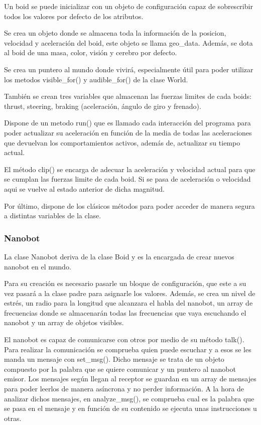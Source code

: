 Un boid se puede inicializar con un objeto de configuración capaz de sobrescribir todos los  valores por defecto de los atributos.

Se crea un objeto donde se almacena toda la información de la posicion, velocidad y aceleración del boid, este objeto se llama geo\_data. Además, se dota al boid de una masa, color, visión y cerebro por defecto.
 
Se crea un puntero al mundo donde vivirá, especialmente útil para poder utilizar los metodos visible\_for() y audible\_for() de la clase World.

También se crean tres variables que almacenan las fuerzas limites de cada boids: thrust, steering, braking (aceleración, ángulo de giro y frenado).
 
Dispone de un metodo run() que es llamado cada interacción del programa para poder actualizar su aceleración en función de la media de todas las aceleraciones que devuelvan los comportamientos activos, además de, actualizar su tiempo actual.
 
El método clip() se encarga de adecuar la aceleración y velocidad actual para que se cumplan las fuerzas limite de cada boid. Si se pasa de aceleración o velocidad aqui se vuelve al estado anterior de dicha magnitud.
 
Por último, dispone de los clásicos métodos para poder acceder de manera segura a distintas variables de la clase.

\subsubsection{Nanobot}
\label{sec:nanobot}

La clase Nanobot deriva de la clase Boid y es la encargada de crear nuevos nanobot en el mundo.
 
Para su creación es necesario pasarle un bloque de configuración, que este a su vez pasará a la clase padre para asignarle los valores. Además, se crea un nivel de estrés, un radio para la longitud que alcanzara el habla del nanobot, un array de frecuencias donde se almacenarán todas las frecuencias que vaya escuchando el nanobot y un array de objetos visibles.
 
El nanobot es capaz de comunicarse con otros por medio de su método talk(). Para realizar la comunicación se comprueba quien puede escuchar y a esos se les manda un mensaje con set\_msg(). Dicho mensaje se trata de un objeto compuesto por la palabra que se quiere comunicar y un puntero al nanobot emisor. Los mensajes según llegan al receptor se guardan en un array de mensajes para poder leerlos de manera asíncrona y no perder información. A la hora de analizar dichos mensajes, en analyze\_msg(), se comprueba cual es la palabra que se pasa en el mensaje y en función de su contenido se ejecuta unas instrucciones u otras. 


